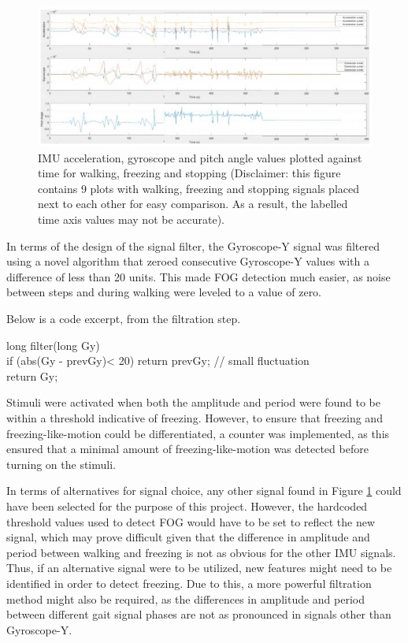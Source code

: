 \documentclass[titlepage]{article}
\begin{document}
\begin{doublespacing}
\begin{figure}[H]
	\includegraphics[width=\linewidth]{graphs}
	\caption{IMU acceleration, gyroscope and pitch angle values plotted against time for walking, freezing and stopping (Disclaimer: this figure contains 9 plots with walking, freezing and stopping signals placed next to each other for easy comparison. As a result, the labelled time axis values may not be accurate).}
	\label{graphs}
\end{figure}

In terms of the design of the signal filter, the Gyroscope-Y signal was filtered using a novel algorithm that zeroed consecutive Gyroscope-Y values with a difference of less than 20 units. This made FOG detection much easier, as noise between steps and during walking were leveled to a value of zero. 

Below is a code excerpt, from the filtration step.

\newenvironment{code}{\ttfamily}{\par}
\begin{code}
\noindent long filter(long Gy) { \\
\indent  if (abs(Gy - prevGy)< 20) return prevGy; // small fluctuation \\
  return Gy; \\
}
\end{code}

Stimuli were activated when both the amplitude and period were found to be within a threshold indicative of freezing. However, to ensure that freezing and freezing-like-motion could be differentiated, a counter was implemented, as this ensured that a minimal amount of freezing-like-motion was detected before turning on the stimuli.

    In terms of alternatives for signal choice, any other signal found in Figure \ref{graphs} could have been selected for the purpose of this project. However, the hardcoded threshold values used to detect FOG would have to be set to reflect the new signal, which may prove difficult given that the difference in amplitude and period between walking and freezing is not as obvious for the other IMU signals. Thus, if an alternative signal were to be utilized, new features might need to be identified in order to detect freezing. Due to this, a more powerful filtration method might also be required, as the differences in amplitude and period between different gait signal phases are not as pronounced in signals other than Gyroscope-Y.


\end{doublespacing}
\end{document}
